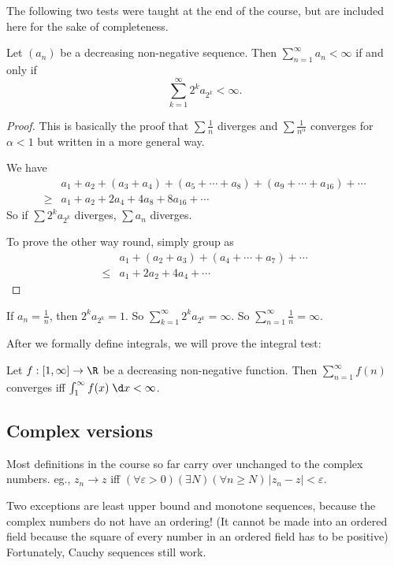 \documentclass[a4paper]{article}
\begin{document}
The following two tests were taught at the end of the course, but are included here for the sake of completeness.
\begin{thm}
  Let $(a_n)$ be a decreasing non-negative sequence. Then $\sum_{n = 1}^\infty a_n < \infty$ if and only if
  \[
    \sum_{k = 1}^\infty 2^k a_{2^k} < \infty.
  \]
\end{thm}

\begin{proof}
  This is basically the proof that $\sum \frac{1}{n}$ diverges and $\sum \frac{1}{n^{\alpha}}$ converges for $\alpha < 1$ but written in a more general way.

  We have
  \begin{align*}
    &a_1 + a_2 + (a_3 + a_4) + (a_5 + \cdots + a_8) + (a_9 + \cdots + a_{16}) + \cdots\\
    \geq & a_1 + a_2 + 2a_4 + 4a_8 + 8 a_{16} + \cdots
  \end{align*}
  So if $\sum 2^k a_{2^k}$ diverges, $\sum a_n$ diverges.

  To prove the other way round, simply group as
  \begin{align*}
    & a_1 + (a_2 + a_3) + (a_4 + \cdots + a_7) + \cdots\\
    \leq & a_1 + 2a_2 + 4a_4 + \cdots
  \end{align*}
\end{proof}

\begin{eg}
  If $a_n = \frac{1}{n}$, then $2^k a_{2^k} = 1$. So $\sum_{k = 1}^\infty 2^k a_{2^k} = \infty$. So $\sum_{n = 1}^\infty \frac{1}{n} = \infty$.
\end{eg}

After we formally define integrals, we will prove the integral test:
\begin{thm}
  Let $f: [1, \infty] \to \R$ be a decreasing non-negative function. Then $\sum_{n = 1}^\infty f(n)$ converges iff $\int_1^\infty f(x)\;\d x < \infty$.
\end{thm}

\subsection{Complex versions}
Most definitions in the course so far carry over unchanged to the complex numbers. eg., $z_n \to z$ iff $(\forall \varepsilon > 0)(\exists N)(\forall n\geq N)\, |z_n - z| < \varepsilon$.

Two exceptions are least upper bound and monotone sequences, because the complex numbers do not have an ordering! (It cannot be made into an ordered field because the square of every number in an ordered field has to be positive) Fortunately, Cauchy sequences still work.
\end{document}
